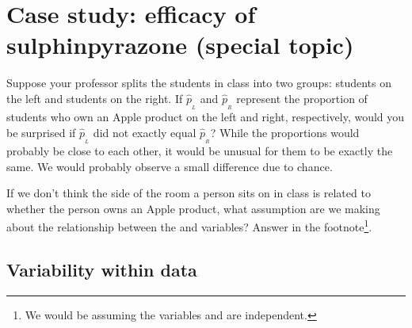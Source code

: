 \section{Case study: efficacy of sulphinpyrazone (special topic)}
\label{caseStudyOfSulphinpyrazone}



\begin{example}{Suppose your professor splits the students in class into two groups: students on the left and students on the right. If $\hat{p}_{_L}$ and $\hat{p}_{_R}$ represent the proportion of students who own an Apple product on the left and right, respectively, would you be surprised if $\hat{p}_{_L}$ did not {exactly} equal $\hat{p}_{_R}$?}\label{classRightLeftSideForHeight}
While the proportions would probably be close to each other, it would be unusual for them to be exactly the same. We would probably observe a small difference due to {chance}.
\end{example}

\begin{exercise}
If we don't think the side of the room a person sits on in class is related to whether the person owns an Apple product, what assumption are we making about the relationship between the  and  variables? %
Answer in the footnote\footnote{We would be assuming the variables  and  are independent. %
}.
\end{exercise}

\subsection{Variability within data}
\label{variabilityWithinData}

